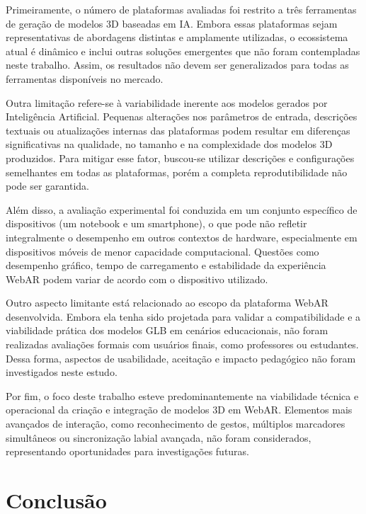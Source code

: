 \documentclass[conference]{IEEEtran}
\begin{document}
Primeiramente, o número de plataformas avaliadas foi restrito a três ferramentas de geração de modelos 3D baseadas em IA. Embora essas plataformas sejam representativas de abordagens distintas e amplamente utilizadas, o ecossistema atual é dinâmico e inclui outras soluções emergentes que não foram contempladas neste trabalho. Assim, os resultados não devem ser generalizados para todas as ferramentas disponíveis no mercado.

Outra limitação refere-se à variabilidade inerente aos modelos gerados por Inteligência Artificial. Pequenas alterações nos parâmetros de entrada, descrições textuais ou atualizações internas das plataformas podem resultar em diferenças significativas na qualidade, no tamanho e na complexidade dos modelos 3D produzidos. Para mitigar esse fator, buscou-se utilizar descrições e configurações semelhantes em todas as plataformas, porém a completa reprodutibilidade não pode ser garantida.

Além disso, a avaliação experimental foi conduzida em um conjunto específico de dispositivos (um notebook e um smartphone), o que pode não refletir integralmente o desempenho em outros contextos de hardware, especialmente em dispositivos móveis de menor capacidade computacional. Questões como desempenho gráfico, tempo de carregamento e estabilidade da experiência WebAR podem variar de acordo com o dispositivo utilizado.

Outro aspecto limitante está relacionado ao escopo da plataforma WebAR desenvolvida. Embora ela tenha sido projetada para validar a compatibilidade e a viabilidade prática dos modelos GLB em cenários educacionais, não foram realizadas avaliações formais com usuários finais, como professores ou estudantes. Dessa forma, aspectos de usabilidade, aceitação e impacto pedagógico não foram investigados neste estudo.

Por fim, o foco deste trabalho esteve predominantemente na viabilidade técnica e operacional da criação e integração de modelos 3D em WebAR. Elementos mais avançados de interação, como reconhecimento de gestos, múltiplos marcadores simultâneos ou sincronização labial avançada, não foram considerados, representando oportunidades para investigações futuras.



\section{Conclusão}
\end{document}
